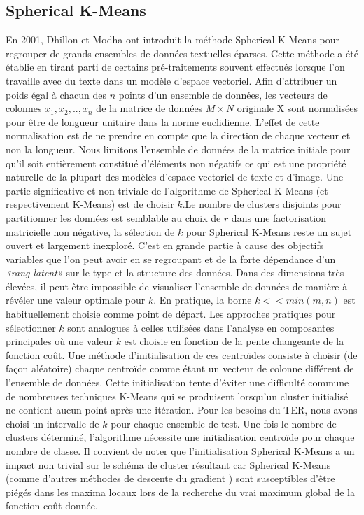\documentclass[runningheads]{llncs}
\begin{document}
\subsection{Spherical K-Means}
En 2001, Dhillon et Modha ont introduit la méthode \cite{hornik2012} Spherical K-Means pour regrouper de grands ensembles de données textuelles éparses. Cette méthode a été établie en tirant parti de certains pré-traitements souvent effectués lorsque l'on travaille avec du texte dans un modèle d'espace vectoriel. Afin d'attribuer un poids égal à chacun des $n$ points d'un ensemble de données, les vecteurs de colonnes $x_{1}, x_{2}, .., x_{n}$ de la matrice de données $M\times N$ originale X sont normalisées pour être de longueur unitaire dans la norme euclidienne. L'effet de cette normalisation est de ne prendre en compte que la direction de chaque vecteur et non la longueur. Nous limitons l'ensemble de données de la matrice initiale pour qu'il soit entièrement constitué d'éléments non négatifs ce qui est une propriété naturelle de la plupart des modèles d'espace vectoriel de texte et d'image.
Une partie significative et non triviale de l'algorithme de Spherical K-Means (et respectivement K-Means) est de choisir $k$.\newline Le nombre de clusters disjoints pour partitionner les données est semblable au choix de $r$ dans une factorisation matricielle non négative, la sélection de $k$ pour Spherical K-Means reste un sujet ouvert et largement inexploré. C'est en grande partie à cause des objectifs variables que l'on peut avoir en se regroupant et de la forte dépendance d'un \textit{«rang latent»} sur le type et la structure des données. Dans des dimensions très élevées, il peut être impossible de visualiser l'ensemble de données de manière à révéler une valeur optimale pour $k$. En pratique, la borne $k << min(m,n)$ est habituellement choisie comme point de départ. Les approches pratiques pour sélectionner $k$ sont analogues à celles utilisées dans l'analyse en composantes principales où une valeur $k$ est choisie en fonction de la pente changeante de la fonction coût. Une méthode d'initialisation de ces centroïdes consiste à choisir (de façon aléatoire) chaque centroïde comme étant un vecteur de colonne différent de l'ensemble de données. Cette initialisation tente d'éviter une difficulté commune de nombreuses techniques K-Means qui se produisent lorsqu'un cluster initialisé ne contient aucun point après une itération. Pour les besoins du TER, nous avons choisi un intervalle de $k$ pour chaque ensemble de test. Une fois le nombre de clusters déterminé, l'algorithme nécessite une initialisation centroïde pour chaque nombre de classe. Il convient de noter que l'initialisation Spherical K-Means a un impact non trivial sur le schéma de cluster résultant car Spherical K-Means (comme d'autres méthodes de descente du gradient \cite{Lin2007}) sont susceptibles d'être piégés dans les maxima locaux lors de la recherche du vrai maximum global de la fonction coût donnée.
\end{document}
